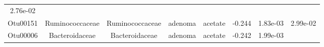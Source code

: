 \documentclass[11pt,]{article}
\begin{document}
\begin{longtable}[]{@{}cccccccc@{}}
\begin{minipage}[t]{0.08\columnwidth}
2.76e-02\strut
\end{minipage}\tabularnewline
\begin{minipage}[t]{0.08\columnwidth}\centering\strut
Otu00151\strut
\end{minipage} & \begin{minipage}[t]{0.15\columnwidth}\centering\strut
Ruminococcaceae\strut
\end{minipage} & \begin{minipage}[t]{0.15\columnwidth}\centering\strut
Ruminococcaceae\strut
\end{minipage} & \begin{minipage}[t]{0.08\columnwidth}\centering\strut
adenoma\strut
\end{minipage} & \begin{minipage}[t]{0.09\columnwidth}\centering\strut
acetate\strut
\end{minipage} & \begin{minipage}[t]{0.07\columnwidth}\centering\strut
-0.244\strut
\end{minipage} & \begin{minipage}[t]{0.08\columnwidth}\centering\strut
1.83e-03\strut
\end{minipage} & \begin{minipage}[t]{0.08\columnwidth}\centering\strut
2.99e-02\strut
\end{minipage}\tabularnewline
\begin{minipage}[t]{0.08\columnwidth}\centering\strut
Otu00006\strut
\end{minipage} & \begin{minipage}[t]{0.15\columnwidth}\centering\strut
Bacteroidaceae\strut
\end{minipage} & \begin{minipage}[t]{0.15\columnwidth}\centering\strut
Bacteroidaceae\strut
\end{minipage} & \begin{minipage}[t]{0.08\columnwidth}\centering\strut
adenoma\strut
\end{minipage} & \begin{minipage}[t]{0.09\columnwidth}\centering\strut
acetate\strut
\end{minipage} & \begin{minipage}[t]{0.07\columnwidth}\centering\strut
-0.242\strut
\end{minipage} & \begin{minipage}[t]{0.08\columnwidth}\centering\strut
1.99e-03\strut
\end{minipage} & \begin{minipage}[t]{0.08\columnwidth}\centering\strut

\end{minipage}
\end{longtable}
\end{document}

